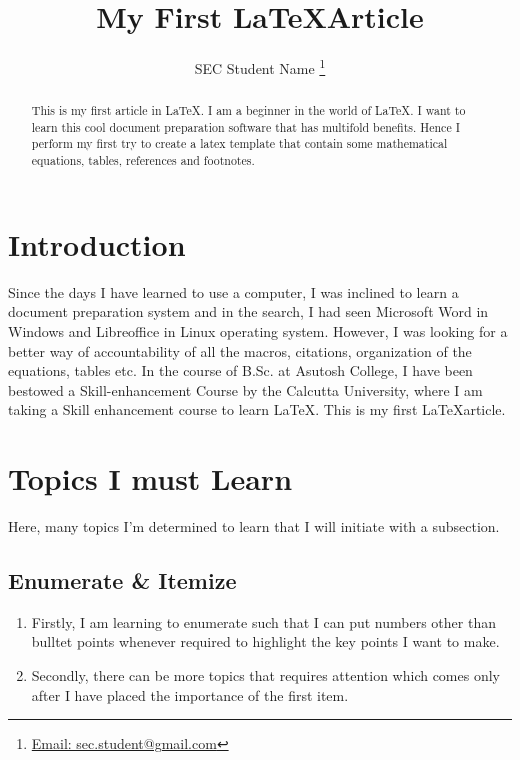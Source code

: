 \documentclass[onecolumn,12pt]{article}
\title{\bf My First \LaTeX Article}
\author{SEC Student Name \thanks{\href{mailto:sec.student@gmail.com}{Email: sec.student@gmail.com}}}
\affil{Department of Physics, Asutosh College, Kolkata 700026, India}
\begin{document}
\maketitle

\begin{abstract}
This is my first article in \LaTeX. I am a beginner in the world of \LaTeX.
I want to learn this cool document preparation software that has multifold benefits. Hence I perform my first try to create a latex template that contain some mathematical equations, tables, references and footnotes.  
\end{abstract}

\section{Introduction}
\label{intro}
Since the days I have learned to use a computer, I was inclined to learn a document preparation system and in the search, I had seen Microsoft Word in Windows and Libreoffice in Linux operating system. However, I was looking for a better way of accountability of all the macros, citations, organization of the equations, tables etc. In the course of B.Sc. at Asutosh College, I have been bestowed a Skill-enhancement Course by the Calcutta University, where I am taking a Skill enhancement course to learn \LaTeX\cite{leslam}. This is my first \LaTeX article. 

\section{Topics I must Learn}
\label{sec:1}
Here, many topics I'm determined to learn that I will initiate with a subsection.
\subsection{Enumerate \& Itemize}
\begin{enumerate}
\item Firstly, I am learning to enumerate such that I can put numbers other than bulltet points whenever required to highlight the key points I want to make. 
\item Secondly, there can be more topics that requires attention which comes only after I have placed the importance of the first item.
\end{enumerate}
\end{document}
